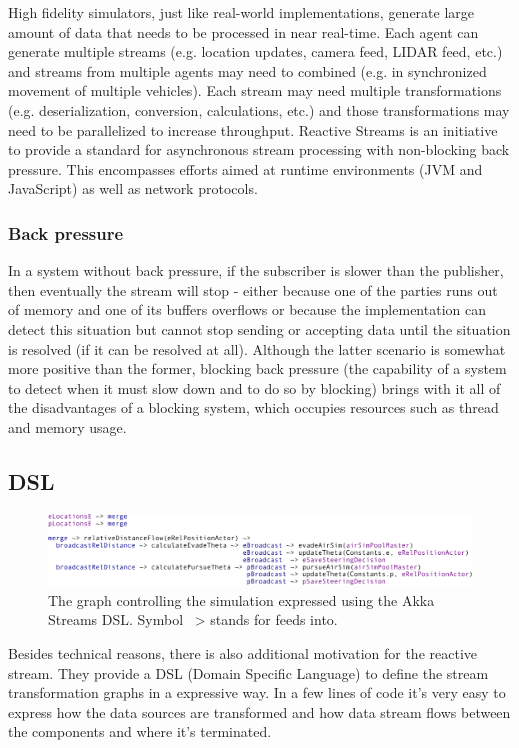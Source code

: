 \documentclass{article}
\begin{document}
High fidelity simulators, just like real-world implementations, generate large amount of data that needs to be processed in near real-time. Each agent can generate multiple streams (e.g. location updates, camera feed, LIDAR feed, etc.) and streams from multiple agents may need to combined (e.g. in synchronized movement of multiple vehicles). Each stream may need multiple transformations (e.g. deserialization, conversion, calculations, etc.) and those transformations may need to be parallelized to increase throughput.
Reactive Streams is an initiative to provide a standard for asynchronous stream processing with non-blocking back pressure. This encompasses efforts aimed at runtime environments (JVM and JavaScript) as well as network protocols. \cite{reactive-manifesto} 

\subsubsection{Back pressure}
In a system without back pressure, if the subscriber is slower than the publisher, then eventually the stream will stop - either because one of the parties runs out of memory and one of its buffers overflows or because the implementation can detect this situation but cannot  stop sending or accepting data until the situation is resolved (if it can be resolved at all). Although the latter scenario is somewhat more positive than the former, blocking back pressure (the capability of a system to detect when it must slow down and to do so by blocking) brings with it all of the disadvantages of a blocking system, which occupies resources such as thread and memory usage. \cite{reactive-web-apps}

\subsection{DSL}
\begin{figure}
	\centering
	\includegraphics[width=17.0cm]{streams-SDL}
	\caption{The graph controlling the simulation expressed using the Akka Streams DSL. Symbol ~> stands for feeds into.}\label{fig:streas-SDL}
\end{figure}

Besides technical reasons, there is also additional motivation for the reactive stream. They provide a DSL (Domain Specific Language) \cite{dsl-book} to define the stream transformation graphs in a expressive way. In a few lines of code it's very easy to express how the data sources are transformed and how data stream flows between the components and where it's terminated.
\end{document}
